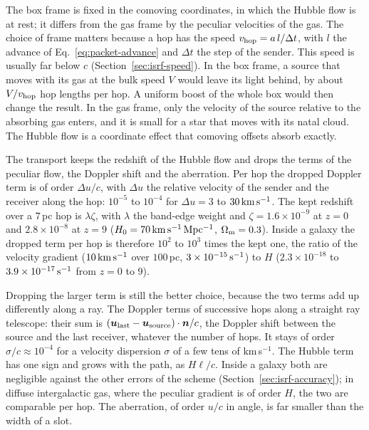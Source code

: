 The box frame is fixed in the comoving coordinates, in which the Hubble flow
is at rest; it differs from the gas frame by the peculiar velocities of the
gas. The choice of frame matters because a hop has the speed
$v_{\rm hop}=a\,l/\Delta t$, with $l$ the advance of
Eq.~\eqref{eq:packet-advance} and $\Delta t$ the step of the sender. This speed
is usually far below $c$ (Section~\ref{sec:isrf-speed}). In the box frame, a
source that moves with its gas at the bulk speed $V$ would leave its light
behind, by about $V/v_{\rm hop}$ hop lengths per hop. A uniform boost of the
whole box would then change the result. In the gas frame, only the velocity of
the source relative to the absorbing gas enters, and it is small for a star
that moves with its natal cloud. The Hubble flow is a coordinate effect that
comoving offsets absorb exactly.

The transport keeps the redshift of the Hubble flow and drops the terms of the
peculiar flow, the Doppler shift and the aberration. Per hop the dropped
Doppler term is of order $\Delta u/c$, with $\Delta u$ the relative velocity
of the sender and the receiver along the hop: $10^{-5}$ to $10^{-4}$ for
$\Delta u=3$ to $30\,{\rm km\,s^{-1}}$. The kept redshift over a $7$\,pc hop
is $\lambda\zeta$, with $\lambda$ the band-edge weight and
$\zeta=1.6\times10^{-9}$ at $z=0$ and $2.8\times10^{-8}$ at $z=9$
($H_0=70\,{\rm km\,s^{-1}\,Mpc^{-1}}$, $\Omega_{\rm m}=0.3$). Inside a galaxy
the dropped term per hop is therefore $10^{2}$ to $10^{3}$ times the kept one,
the ratio of the velocity gradient ($10\,{\rm km\,s^{-1}}$ over $100$\,pc,
$3\times10^{-15}\,{\rm s^{-1}}$) to $H$ ($2.3\times10^{-18}$ to
$3.9\times10^{-17}\,{\rm s^{-1}}$ from $z=0$ to 9).

Dropping the larger term is still the better choice, because the two terms
add up differently along a ray. The Doppler terms of successive hops along a
straight ray telescope: their sum is
$(\boldsymbol u_{\rm last}-\boldsymbol u_{\rm source})\cdot\boldsymbol n/c$, the
Doppler shift between the source and the last receiver, whatever the number of
hops. It stays of order $\sigma/c\approx10^{-4}$ for a velocity dispersion
$\sigma$ of a few tens of km\,s$^{-1}$. The Hubble term has one sign and grows
with the path, as $H\ell/c$. Inside a galaxy both are negligible against the
other errors of the scheme (Section~\ref{sec:isrf-accuracy}); in diffuse
intergalactic gas, where the peculiar gradient is of order $H$, the two are
comparable per hop. The aberration, of order $u/c$ in angle, is far smaller
than the width of a slot.

